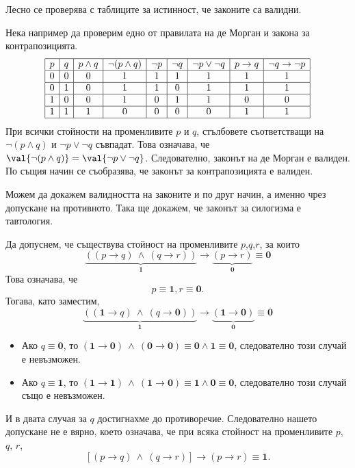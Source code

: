 Лесно се проверява с таблиците за истинност, че законите са валидни.

\begin{example}
  Нека например да проверим едно от правилата на де Морган и закона
  за контрапозицията.
  \[
  \begin{array}{|c|c|c|c|c|c|c|c|c|}
    \hline
    p & q & p\wedge q & \neg(p\wedge q) & \neg p & \neg q & \neg p \vee \neg q & p \rightarrow q & \neg q \rightarrow \neg p\\
    \hline
    0 & 0 & 0 & 1 & 1 & 1 & 1 & 1 & 1 \\
    \hline
    0 & 1 & 0 & 1 & 1 & 0 & 1 & 1 & 1 \\
    \hline
    1 & 0 & 0 & 1 & 0 & 1 & 1 & 0 & 0 \\
    \hline
    1 & 1 & 1 & 0 & 0 & 0 & 0 & 1 & 1 \\
    \hline
  \end{array}
  \]
  При всички стойности на променливите $p$ и $q$, стълбовете съответстващи на $\neg(p \wedge q)$ и $\neg p \vee \neg q$
  съвпадат. Това означава, че $\val{\neg(p \land q)} = \val{\neg p \lor \neg q}$.  
  Следователно, законът на де Морган е валиден.
  По същия начин се съобразява, че законът за контрапозицията е валиден.
\end{example}

\begin{example}
  Можем да докажем валидността на законите и по друг начин, а именно чрез допускане на противното.
  Така ще докажем, че законът за силогизма е тавтология.
  
  Да допуснем, че съществува стойност на променливите $p$,$q$,$r$, за които
  \[\underbrace{((p\rightarrow q)\ \wedge\ (q\rightarrow r))}_{\mathbf{1}} \rightarrow \underbrace{(p\rightarrow r)}_{\mathbf{0}} \equiv {\mathbf 0}\]
  Това означава, че
  \[p \equiv \mathbf{1}, r \equiv \mathbf{0}.\]
  Тогава, като заместим,
  \[\underbrace{((\mathbf{1}\rightarrow q)\ \wedge\ (q\rightarrow \mathbf{0}))}_{\mathbf{1}} \rightarrow \underbrace{(\mathbf{1}\rightarrow \mathbf{0})}_{\mathbf{0}} \equiv {\mathbf 0}\]
  \begin{itemize}
  \item 
    Ако $q \equiv \mathbf{0}$, то $(\mathbf{1}\rightarrow \mathbf{0})\ \wedge\ (\mathbf{0}\rightarrow \mathbf{0}) \equiv \mathbf{0} \wedge \mathbf{1} \equiv \mathbf{0}$,
    следователно този случай е невъзможен.
  \item
    Ако $q \equiv \mathbf{1}$, то $(\mathbf{1}\rightarrow \mathbf{1})\ \wedge\ (\mathbf{1}\rightarrow \mathbf{0}) \equiv \mathbf{1} \wedge \mathbf{0} \equiv \mathbf{0}$,
    следователно този случай също е невъзможен.
  \end{itemize}
  И в двата случая за $q$ достигнахме до противоречие.
  Следователно нашето допускане не е вярно, което означава, че
  при всяка стойност на променливите $p$, $q$, $r$,
  \[[(p\rightarrow q)\ \wedge\ (q\rightarrow r)] \rightarrow (p\rightarrow r) \equiv {\mathbf 1}.\]
\end{example}


